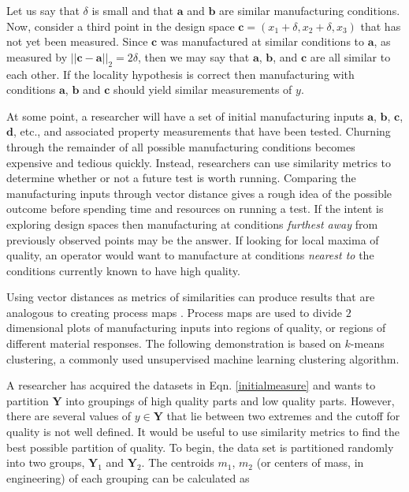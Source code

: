 Let us say that $\delta$ is small and that $\mathbf{a}$ and $\mathbf{b}$ are similar manufacturing conditions.
Now, consider a third point in the design space $\mathbf{c} = (x_{1} + \delta, x_2 + \delta, x_3)$ that has not yet been measured.
Since $\mathbf{c}$ was manufactured at similar conditions to $\mathbf{a}$, as measured by $||\mathbf{c} - \mathbf{a}||_2 = 2\delta$, then we may say that $\mathbf{a}$, $\mathbf{b}$, and $\mathbf{c}$ are all similar to each other. If the locality hypothesis is correct then manufacturing with conditions $\mathbf{a}$, $\mathbf{b}$ and $\mathbf{c}$ should yield similar measurements of $y$.

At some point, a researcher will have a set of initial manufacturing inputs $\mathbf{a}$, $\mathbf{b}$, $\mathbf{c}$, $\mathbf{d}$, etc., and associated property measurements that have been tested.
Churning through the remainder of all possible manufacturing conditions becomes expensive and tedious quickly.
Instead, researchers can use similarity metrics to determine whether or not a future test is worth running.
Comparing the manufacturing inputs through vector distance gives a rough idea of the possible outcome before spending time and resources on running a test.
If the intent is exploring design spaces then manufacturing at conditions \textit{furthest away} from previously observed points may be the answer.
If looking for local maxima of quality, an operator would want to manufacture at conditions \textit{nearest to} the conditions currently known to have high quality.

Using vector distances as metrics of similarities can produce results that are analogous to creating process maps \cite{Beuth2001}.
Process maps are used to divide $2$ dimensional plots of manufacturing inputs into regions of quality, or regions of different material responses.
The following demonstration is based on $k$-means clustering, a commonly used unsupervised machine learning clustering algorithm.

A researcher has acquired the datasets in Eqn. \ref{initialmeasure} and wants to partition $\mathbf{Y}$ into groupings of high quality parts and low quality parts.
However, there are several values of $y \in \mathbf{Y}$ that lie between two extremes and the cutoff for quality is not well defined.
It would be useful to use similarity metrics to find the best possible partition of quality.
To begin, the data set is partitioned randomly into two groups, $\mathbf{Y}_1$ and $\mathbf{Y}_2$.
The centroids $m_1$, $m_2$ (or centers of mass, in engineering) of each grouping can be calculated as

